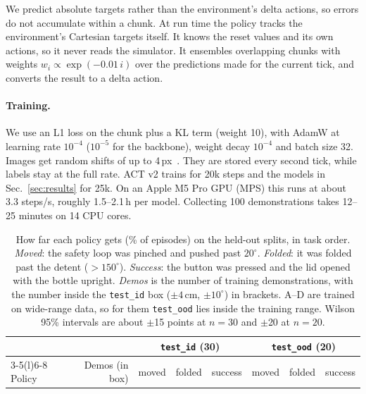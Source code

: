 \documentclass[10pt,twocolumn,letterpaper]{article}
\newcommand{\ttt}[1]{\texttt{\small #1}}
\begin{document}
We predict absolute targets rather than the environment's delta actions, so errors do not accumulate within a
chunk. At run time the policy tracks the environment's Cartesian targets itself. It knows the reset values and
its own actions, so it never reads the simulator. It ensembles overlapping chunks with weights
$w_i\propto\exp(-0.01\,i)$ over the predictions made for the current tick, and converts the result to a delta
action.

\paragraph{Training.} We use an L1 loss on the chunk plus a KL term (weight 10), with AdamW at learning rate
$10^{-4}$ ($10^{-5}$ for the backbone), weight decay $10^{-4}$ and batch size 32. Images get random shifts of
up to 4\,px~\cite{drq}. They are stored every second tick, while labels stay at the full rate. ACT v2 trains
for 20k steps and the models in Sec.~\ref{sec:results} for 25k. On an Apple M5 Pro GPU (MPS) this runs at about
3.3 steps/s, roughly 1.5--2.1\,h per model. Collecting 100 demonstrations takes 12--25 minutes on 14 CPU
cores.

\begin{table}[t]
\centering
\caption{How far each policy gets (\% of episodes) on the held-out splits, in task order. \emph{Moved}: the
safety loop was pinched and pushed past $20^\circ$. \emph{Folded}: it was folded past the detent
($>150^\circ$). \emph{Success}: the button was pressed and the lid opened with the bottle upright.
\emph{Demos} is the number of training demonstrations, with the number inside the \ttt{test\_id} box
($\pm4$\,cm, $\pm10^\circ$) in brackets. A--D are trained on wide-range data, so for them \ttt{test\_ood} lies
inside the training range. Wilson 95\% intervals are about $\pm$15 points at $n=30$ and $\pm$20 at $n=20$.}
\label{tab:results}
\small
\begin{tabular}{@{}lrrrrrrr@{}}
\toprule
& & \multicolumn{3}{c}{\ttt{test\_id} (30)} & \multicolumn{3}{c}{\ttt{test\_ood} (20)} \\
\cmidrule(lr){3-5}\cmidrule(l){6-8}
Policy & Demos (in box) & moved & folded & success & moved & folded & success \\
\midrule

\end{tabular}
\end{table}
\end{document}

